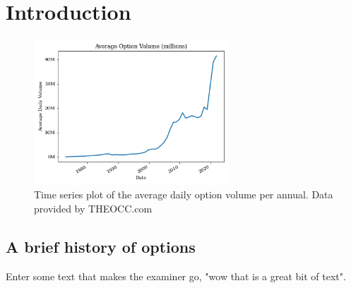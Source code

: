 \chapter{Introduction}

\begin{figure}[H]
    \centering
    \includegraphics[width=0.65\textwidth]{Chapters/C1/plots/OptionVolume.png}
    \caption{Time series plot of the average daily option volume per annual. Data provided by THEOCC.com \cite{THEOCC}}
    \label{C1fig:OptionVolume}
\end{figure}

\section{A brief history of options}

Enter some text that makes the examiner go, "wow that is a great bit of text". 

